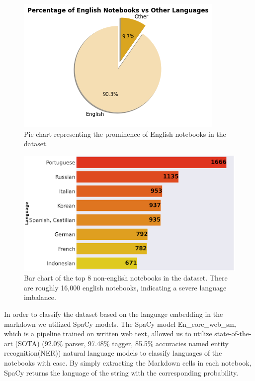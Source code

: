 \documentclass[conference]{IEEEtran}
\begin{document}
\begin{figure}[h]
  \centering
  \includegraphics[width=\linewidth]{eng_percent}
  \caption{Pie chart representing the prominence of English notebooks in the dataset.}
\end{figure}

\begin{figure}[h]
  \centering
  \includegraphics[width=\linewidth]{freq}
  \caption{Bar chart of the top 8 non-english notebooks in the dataset. There are roughly 16,000 english notebooks, indicating a severe language imbalance.}
\end{figure}

In order to classify the dataset based on the language embedding in the markdown we utilized SpaCy models. The SpaCy model En\_core\_web\_sm, which is a pipeline trained on written web text, allowed us to utilize state-of-the-art (SOTA)  (92.0\% parser, 97.48\% tagger, 85.5\% accuracies named entity recognition(NER)) natural language models to classify languages of the  notebooks with ease.  By simply extracting the Markdown cells in each notebook, SpaCy returns the language of the string with the corresponding probability.
\end{document}
